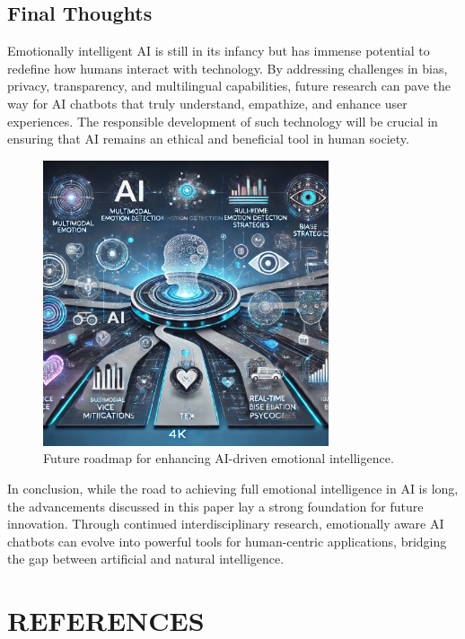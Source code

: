 \documentclass[a4paper,10pt]{article}
\begin{document}
\subsection{Final Thoughts}
Emotionally intelligent AI is still in its infancy but has immense potential to redefine how humans interact with technology. By addressing challenges in bias, privacy, transparency, and multilingual capabilities, future research can pave the way for AI chatbots that truly understand, empathize, and enhance user experiences. The responsible development of such technology will be crucial in ensuring that AI remains an ethical and beneficial tool in human society.

\begin{figure}[h]
    \centering
    \includegraphics[width=0.75\textwidth]{imag15.png}
    \caption{Future roadmap for enhancing AI-driven emotional intelligence.}
    \label{fig:ai_future_direction}
\end{figure}

\noindent In conclusion, while the road to achieving full emotional intelligence in AI is long, the advancements discussed in this paper lay a strong foundation for future innovation. Through continued interdisciplinary research, emotionally aware AI chatbots can evolve into powerful tools for human-centric applications, bridging the gap between artificial and natural intelligence.



\section{REFERENCES}
\end{document}
